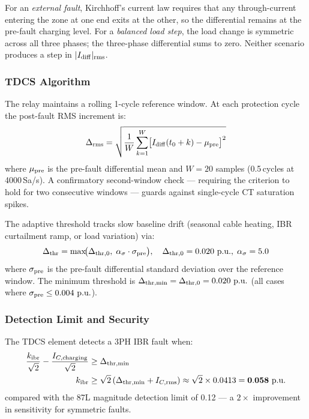 \documentclass[journal,twoside,10pt]{IEEEtran}
\newcommand{\Idiff}{I_{\mathrm{diff}}}
\newcommand{\kibr}{k_{\mathrm{ibr}}}
\newcommand{\pu}{\,\text{p.u.}}
\begin{document}
For an \emph{external fault}, Kirchhoff's current law requires that any
through-current entering the zone at one end exits at the other, so the
differential remains at the pre-fault charging level.
For a \emph{balanced load step}, the load change is symmetric across all
three phases; the three-phase differential sums to zero.
Neither scenario produces a step in $|\Idiff|_{\rm rms}$.

\subsubsection{TDCS Algorithm}

The relay maintains a rolling 1-cycle reference window.
At each protection cycle the post-fault RMS increment is:
\begin{equation}
  \Delta_{\rm rms} = \sqrt{\frac{1}{W}\sum_{k=1}^{W}
    \bigl[\Idiff(t_0+k) - \mu_{\rm pre}\bigr]^2}
  \label{eq:tdcs}
\end{equation}
where $\mu_{\rm pre}$ is the pre-fault differential mean and $W = 20$
samples (0.5\,cycles at 4000\,Sa/s).  A confirmatory second-window check
--- requiring the criterion to hold for two consecutive windows --- guards
against single-cycle CT saturation spikes.

The adaptive threshold tracks slow baseline drift (seasonal cable heating,
IBR curtailment ramp, or load variation) via:
\begin{equation}
  \Delta_{\rm thr} = \max\!\bigl(\Delta_{\rm thr,0},\;
                     \alpha_\sigma \cdot \sigma_{\rm pre}\bigr),
  \quad \Delta_{\rm thr,0} = 0.020\,\pu,\; \alpha_\sigma = 5.0
  \label{eq:tdcs_thr}
\end{equation}
where $\sigma_{\rm pre}$ is the pre-fault differential standard deviation
over the reference window.  The minimum threshold is
$\Delta_{\rm thr,min} = \Delta_{\rm thr,0} = 0.020\,\pu$
(all cases where $\sigma_{\rm pre} \leq 0.004\,\pu$).

\subsubsection{Detection Limit and Security}

The TDCS element detects a 3PH IBR fault when:
\begin{align}
  \frac{\kibr}{\sqrt{2}} - \frac{I_{C,\rm charging}}{\sqrt{2}}
    &\geq \Delta_{\rm thr,min} \notag \\
  \kibr &\geq \sqrt{2}\,(\Delta_{\rm thr,min} + I_{C,\rm rms})
         \approx \sqrt{2} \times 0.0413 = \mathbf{0.058\,\pu}
  \label{eq:detlim}
\end{align}
compared with the 87L magnitude detection limit of 0.12\,\pu --- a
$2\times$ improvement in sensitivity for symmetric faults.
\end{document}
